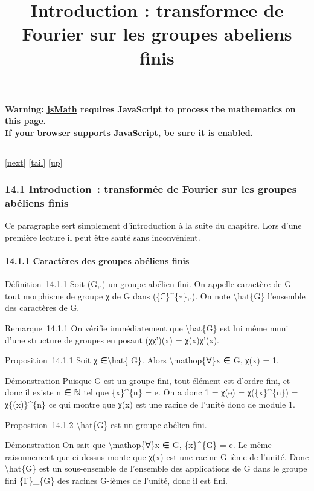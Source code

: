 \documentclass[]{article}
\title{Introduction : transformee de Fourier sur les groupes abeliens finis}
\author{}
\date{}
\begin{document}
\maketitle

\textbf{Warning: \href{http://www.math.union.edu/locate/jsMath}{jsMath}
requires JavaScript to process the mathematics on this page.\\ If your
browser supports JavaScript, be sure it is enabled.}

\begin{center}\rule{3in}{0.4pt}\end{center}

{[}\href{coursse78.html}{next}{]}
{[}\hyperref[tailcoursse77.html]{tail}{]}
{[}\href{coursch15.html\#coursse77.html}{up}{]}

\subsubsection{14.1 Introduction~: transformée de Fourier sur les
groupes abéliens finis}

Ce paragraphe sert simplement d'introduction à la suite du chapitre.
Lors d'une première lecture il peut être sauté sans inconvénient.

\paragraph{14.1.1 Caractères des groupes abéliens finis}

Définition~14.1.1 Soit (G,.) un groupe abélien fini. On appelle
caractère de G tout morphisme de groupe χ de G dans (\{ℂ\}\^{}\{∗\},.).
On note \textbackslash{}hat\{G\} l'ensemble des caractères de G.

Remarque~14.1.1 On vérifie immédiatement que \textbackslash{}hat\{G\}
est lui même muni d'une structure de groupes en posant (χχ')(x) =
χ(x)χ'(x).

Proposition~14.1.1 Soit χ ∈\textbackslash{}hat\{ G\}. Alors
\textbackslash{}mathop\{∀\}x ∈ G, \textbar{}χ(x)\textbar{} = 1.

Démonstration Puisque G est un groupe fini, tout élément est d'ordre
fini, et donc il existe n ∈ ℕ tel que \{x\}\^{}\{n\} = e. On a donc 1 =
χ(e) = χ(\{x\}\^{}\{n\}) = χ\{(x)\}\^{}\{n\} ce qui montre que χ(x) est
une racine de l'unité donc de module 1.

Proposition~14.1.2 \textbackslash{}hat\{G\} est un groupe abélien fini.

Démonstration On sait que \textbackslash{}mathop\{∀\}x ∈ G,
\{x\}\^{}\{\textbar{}G\textbar{}\} = e. Le même raisonnement que ci
dessus monte que χ(x) est une racine \textbar{}G\textbar{}-ième de
l'unité. Donc \textbackslash{}hat\{G\} est un sous-ensemble de
l'ensemble des applications de G dans le groupe fini
\{Γ\}\_\{\textbar{}G\textbar{}\} des racines \textbar{}G\textbar{}-ièmes
de l'unité, donc il est fini.
\end{document}
